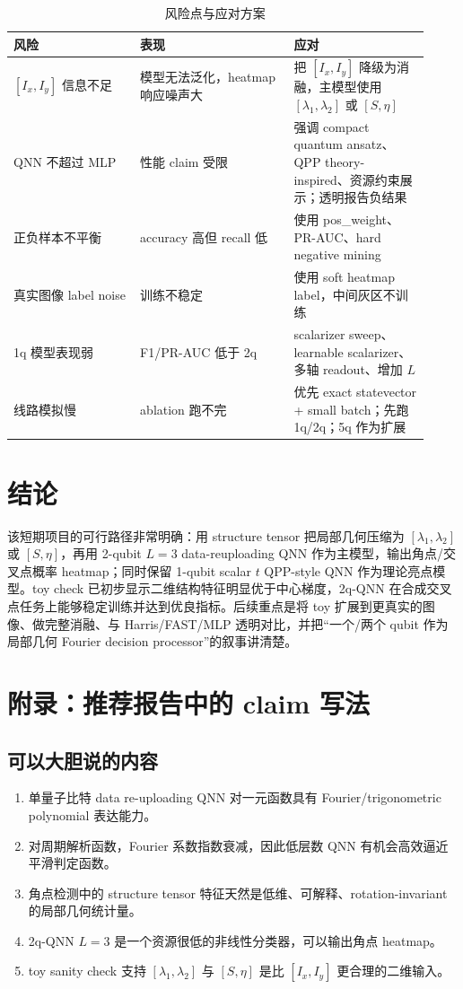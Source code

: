 \documentclass[UTF8,zihao=-4]{ctexart}
\begin{document}
\begin{longtable}{p{0.28\linewidth}p{0.34\linewidth}p{0.30\linewidth}}
\caption{风险点与应对方案}\\
\toprule
风险 & 表现 & 应对 \\
\midrule
$[I_x,I_y]$ 信息不足 & 模型无法泛化，heatmap 响应噪声大 & 把 $[I_x,I_y]$ 降级为消融，主模型使用 $[\lambda_1,\lambda_2]$ 或 $[S,\eta]$ \\
QNN 不超过 MLP & 性能 claim 受限 & 强调 compact quantum ansatz、QPP theory-inspired、资源约束展示；透明报告负结果 \\
正负样本不平衡 & accuracy 高但 recall 低 & 使用 pos\_weight、PR-AUC、hard negative mining \\
真实图像 label noise & 训练不稳定 & 使用 soft heatmap label，中间灰区不训练 \\
1q 模型表现弱 & F1/PR-AUC 低于 2q & scalarizer sweep、learnable scalarizer、多轴 readout、增加 $L$ \\
线路模拟慢 & ablation 跑不完 & 优先 exact statevector + small batch；先跑 1q/2q；5q 作为扩展 \\
\bottomrule
\end{longtable}

\section{结论}

该短期项目的可行路径非常明确：用 structure tensor 把局部几何压缩为 $[\lambda_1,\lambda_2]$ 或 $[S,\eta]$，再用 2-qubit $L=3$ data-reuploading QNN 作为主模型，输出角点/交叉点概率 heatmap；同时保留 1-qubit scalar $t$ QPP-style QNN 作为理论亮点模型。toy check 已初步显示二维结构特征明显优于中心梯度，2q-QNN 在合成交叉点任务上能够稳定训练并达到优良指标。后续重点是将 toy 扩展到更真实的图像、做完整消融、与 Harris/FAST/MLP 透明对比，并把“一个/两个 qubit 作为局部几何 Fourier decision processor”的叙事讲清楚。

\appendix
\section{附录：推荐报告中的 claim 写法}

\subsection{可以大胆说的内容}
\begin{enumerate}[leftmargin=2.0em]
    \item 单量子比特 data re-uploading QNN 对一元函数具有 Fourier/trigonometric polynomial 表达能力。
    \item 对周期解析函数，Fourier 系数指数衰减，因此低层数 QNN 有机会高效逼近平滑判定函数。
    \item 角点检测中的 structure tensor 特征天然是低维、可解释、rotation-invariant 的局部几何统计量。
    \item 2q-QNN $L=3$ 是一个资源很低的非线性分类器，可以输出角点 heatmap。
    \item toy sanity check 支持 $[\lambda_1,\lambda_2]$ 与 $[S,\eta]$ 是比 $[I_x,I_y]$ 更合理的二维输入。
\end{enumerate}
\end{document}
